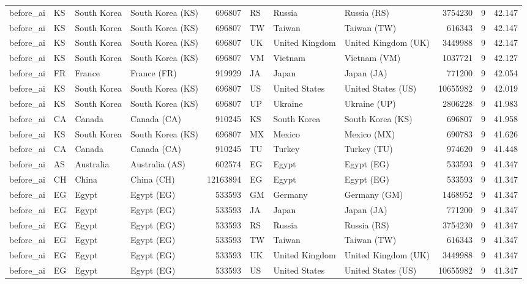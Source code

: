 \begin{tabular}{llllrlllrrr}
before\_ai & KS & South Korea & South Korea (KS) & 696807 & RS & Russia & Russia (RS) & 3754230 & 9 & 42.147 \\
before\_ai & KS & South Korea & South Korea (KS) & 696807 & TW & Taiwan & Taiwan (TW) & 616343 & 9 & 42.147 \\
before\_ai & KS & South Korea & South Korea (KS) & 696807 & UK & United Kingdom & United Kingdom (UK) & 3449988 & 9 & 42.147 \\
before\_ai & KS & South Korea & South Korea (KS) & 696807 & VM & Vietnam & Vietnam (VM) & 1037721 & 9 & 42.127 \\
before\_ai & FR & France & France (FR) & 919929 & JA & Japan & Japan (JA) & 771200 & 9 & 42.054 \\
before\_ai & KS & South Korea & South Korea (KS) & 696807 & US & United States & United States (US) & 10655982 & 9 & 42.019 \\
before\_ai & KS & South Korea & South Korea (KS) & 696807 & UP & Ukraine & Ukraine (UP) & 2806228 & 9 & 41.983 \\
before\_ai & CA & Canada & Canada (CA) & 910245 & KS & South Korea & South Korea (KS) & 696807 & 9 & 41.958 \\
before\_ai & KS & South Korea & South Korea (KS) & 696807 & MX & Mexico & Mexico (MX) & 690783 & 9 & 41.626 \\
before\_ai & CA & Canada & Canada (CA) & 910245 & TU & Turkey & Turkey (TU) & 974620 & 9 & 41.448 \\
before\_ai & AS & Australia & Australia (AS) & 602574 & EG & Egypt & Egypt (EG) & 533593 & 9 & 41.347 \\
before\_ai & CH & China & China (CH) & 12163894 & EG & Egypt & Egypt (EG) & 533593 & 9 & 41.347 \\
before\_ai & EG & Egypt & Egypt (EG) & 533593 & GM & Germany & Germany (GM) & 1468952 & 9 & 41.347 \\
before\_ai & EG & Egypt & Egypt (EG) & 533593 & JA & Japan & Japan (JA) & 771200 & 9 & 41.347 \\
before\_ai & EG & Egypt & Egypt (EG) & 533593 & RS & Russia & Russia (RS) & 3754230 & 9 & 41.347 \\
before\_ai & EG & Egypt & Egypt (EG) & 533593 & TW & Taiwan & Taiwan (TW) & 616343 & 9 & 41.347 \\
before\_ai & EG & Egypt & Egypt (EG) & 533593 & UK & United Kingdom & United Kingdom (UK) & 3449988 & 9 & 41.347 \\
before\_ai & EG & Egypt & Egypt (EG) & 533593 & US & United States & United States (US) & 10655982 & 9 & 41.347 \\

\end{tabular}

